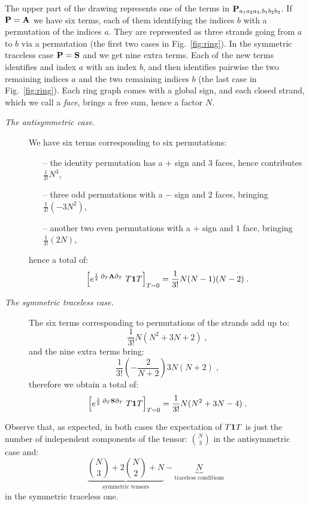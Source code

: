 \documentclass[10pt]{article}
\theoremstyle{plain}
\theoremstyle{definition}
\newcommand{\bP}{ {\bf P} }
\newcommand{\bA}{ {\bf A} }
\newcommand{\bS}{ {\bf S} }
\begin{document}
The upper part of the drawing represents one of the terms in $\bP_{a_1a_2a_3,b_1b_2b_3}  $. If $\bP = \bA$ we have six terms, each of them 
identifying the indices $b$ with a permutation of the indices $a$. They are represented as three strands going from $a$ to $b$ via a permutation (the first two cases in  Fig.~\ref{fig:ring}).
In the symmetric traceless case $\bP = \bS$ and we get nine extra terms. Each of the new terms identifies and index $a$ with an index $b$, and then identifies pairwise the two remaining indices $a$ and the two 
remaining indices $b$ (the last case in  Fig.~\ref{fig:ring}).
Each ring graph comes with a global sign, and each closed strand, which we call a \emph{face}, brings a free sum, hence a factor $N$. 
\begin{description}
 \item[\it The antisymmetric case.] We have six terms corresponding to six permutations:
     \begin{itemize}
      \item[--] the identity permutation has a $+$ sign and $3$ faces, hence contributes $ \frac{1}{3!} N^3$,
      \item[--] three odd permutations with a $-$ sign and $2$ faces, bringing $\frac{1}{3!} (-3N^2) $,
      \item[--] another two even permutations with a $+$ sign and $1$ face, bringing $\frac{1}{3!} (2N)$,
     \end{itemize}
   hence a total of:
    \[
      \left[ e^{\frac{1}{2} \;  \partial_T \bA \partial_T    }      \;  T {\bf 1} T \right]_{T=0} =\frac{1}{3!} N(N-1)(N-2) \;.
    \]
 \item[\it The symmetric traceless case.] The six terms corresponding to permutations of the strands add up to:
     \[ 
      \frac{1}{3!} N(N^2 + 3N  + 2) \;,
     \]
     and the nine extra terms bring:
      \[
       \frac{1}{3!} \left( -\frac{2}{N+2} \right) 3N (N+2) \;,
      \]
     therefore we obtain a total of:
      \[
       \left[ e^{\frac{1}{2} \;  \partial_T \bS \partial_T    }      \;  T {\bf 1} T \right]_{T=0} = \frac{1}{3!}  N(N^2 + 3N  - 4) \;.
      \]

\end{description}
 
    Observe that, as expected, in both cases the expectation of $T {\bf 1} T$ is just the number of independent components of the tensor: $\binom{N}{3}$ in the antisymmetric case and:
    \[
     \underbrace{ \binom{N}{3} +  2 \binom{N}{2} + N }_{\text{symmetric tensors} } -\underbrace{ N }_{\text{traceless conditions}} 
    \]
    in the symmetric traceless one. 
\end{document}
